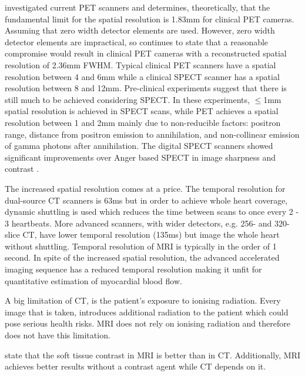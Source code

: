 \cite{moses2011fundamental} investigated current \ac{PET} scanners and determines, theoretically, that the fundamental  limit for the spatial resolution is 1.83mm for clinical PET cameras. Assuming that zero width detector elements are used. However, zero width detector elements are impractical, so \cite{moses2011fundamental} continues to state that a reasonable compromise would result in clinical PET cameras with a reconstructed spatial resolution of 2.36mm \ac{FWHM}. Typical clinical \ac{PET} scanners have a spatial resolution between 4 and 6mm while a clinical \ac{SPECT} scanner has a spatial resolution between 8 and 12mm. Pre-clinical experiments suggest that  there is still much to be achieved considering \ac{SPECT}\citep{khalil2011molecular}. In these experiments, $\leq$1mm spatial resolution is achieved in \ac{SPECT} scans, while \ac{PET} achieves a spatial resolution between 1 and 2mm mainly due to  non-reducible factors: positron range, distance from positron emission to annihilation, and non-collinear emission of gamma photons after annihilation. The digital \ac{SPECT} scanners showed significant improvements over Anger based \ac{SPECT} in image sharpness and contrast \cite{goshen2018feasibility, gambhir2009novel}.

The increased spatial resolution comes at a price. The temporal resolution for dual-source \ac{CT} scanners is 63ms but in order to achieve whole heart coverage, dynamic shuttling is used which reduces the time between scans to once every 2 - 3 heartbeats. More advanced scanners, with wider detectors, e.g. 256- and 320-slice \ac{CT}, have lower temporal resolution (135ms) but image the whole heart without shuttling. Temporal resolution of \ac{MRI} is typically in the order of 1 second. In spite of the increased spatial resolution, the advanced accelerated imaging sequence has a reduced temporal resolution making it unfit for quantitative estimation of myocardial blood flow\citep{pelgrim2016quantitative}.

A big limitation of \ac{CT}, is the patient's exposure to ionising radiation. Every image that is taken, introduces additional radiation to the patient which could pose serious health risks. \ac{MRI} does not rely on ionising radiation and therefore does not have this limitation.

\cite{khalil2011molecular} state that the soft tissue contrast in \ac{MRI} is better than in \ac{CT}. Additionally, \ac{MRI} achieves better results without a contrast agent while \ac{CT} depends on it.